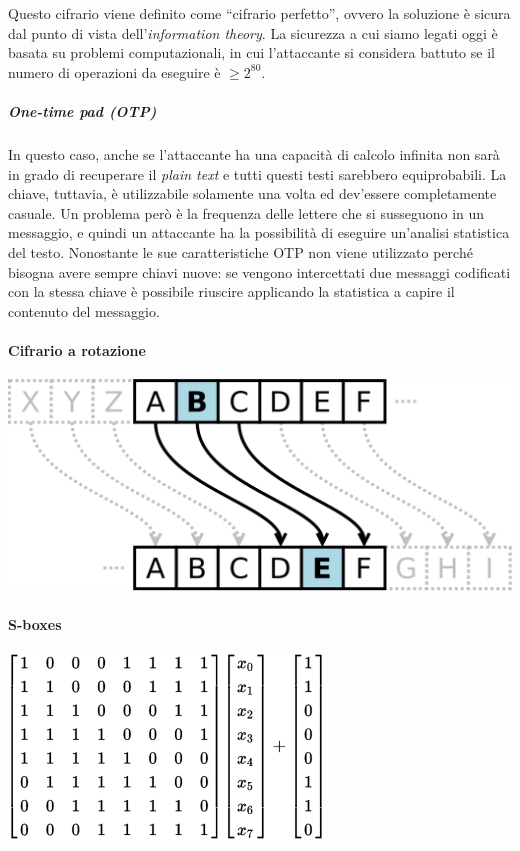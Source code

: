 Questo cifrario viene definito come ``cifrario perfetto'', ovvero la soluzione è
sicura dal punto di vista dell'\textit{information theory}. La sicurezza a cui
siamo legati oggi è basata su problemi computazionali, in cui l'attaccante si
considera battuto se il numero di operazioni da eseguire è $\ge 2^{80}$.

\subparagraph*{One-time pad (OTP)}
In questo caso, anche se l'attaccante ha una capacità di calcolo infinita non
sarà in grado di recuperare il \textit{plain text} e tutti questi testi
sarebbero equiprobabili.
La chiave, tuttavia, è utilizzabile solamente una volta ed dev'essere
completamente casuale.
Un problema però è la frequenza delle lettere che si susseguono in un messaggio,
e quindi un attaccante ha la possibilità di eseguire un'analisi statistica del
testo.
Nonostante le sue caratteristiche OTP non viene utilizzato perché bisogna avere
sempre chiavi nuove: se vengono intercettati due messaggi codificati con la
stessa chiave è possibile riuscire applicando la statistica a capire il
contenuto del messaggio.

\paragraph{Cifrario a rotazione}

\begin{center}
  \includegraphics[scale=0.2]{res/img/caesar.png}
  \label{fig:password:caesar}
\end{center}


\paragraph{S-boxes}

\begin{center}
  \includegraphics[scale=0.5]{res/img/sboxes.png}
  \label{fig:password:sboxes}
\end{center}


